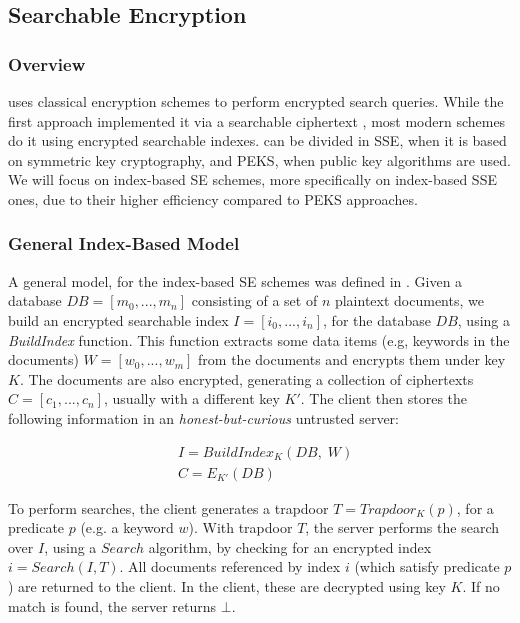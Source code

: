 \subsection{Searchable Encryption}
\label{ch2:sec:searchable-encryption}

\subsubsection{Overview}
 uses classical encryption schemes to perform encrypted search queries. While the first approach implemented it via a searchable ciphertext \autocite{Song2000-hu}, most modern schemes do it using encrypted searchable indexes.  can be divided in \gls{SSE}, when it is based on symmetric key cryptography, and \gls{PEKS}, when public key algorithms are used. We will focus on index-based \gls{SE} schemes, more specifically on index-based \gls{SSE} ones, due to their higher efficiency compared to \gls{PEKS} approaches.



\subsubsection{General Index-Based Model}

A general model, for the index-based \gls{SE} schemes was defined in \autocite{Bosch2014-eb}. Given a database $DB=[m_{0},...,m_{n}]$ consisting of a set of $n$ plaintext documents, we build an encrypted searchable index $I=[i_0,...,i_n]$, for the database $DB$, using a \emph{BuildIndex} function. This function extracts some data items (e.g, keywords in the documents) $W=[w_{0},...,w_{m}]$ from the documents and encrypts them under key $K$. The documents are also encrypted, generating a collection of ciphertexts $C=[c_1,...,c_n]$, usually with a different key $K'$. The client then stores the following information in an \emph{honest-but-curious} untrusted server:

\begin{equation}
    \begin{split}
    &I = BuildIndex_{K}(DB, \; W) \\
    &C = E_{K'}(DB) 
    \end{split}
\end{equation}

To perform searches, the client generates a trapdoor $T = Trapdoor_{K}(p)$, for a predicate $p$ (e.g. a keyword $w$). With trapdoor $T$, the server performs the search over $I$, using a $Search$ algorithm, by checking for an encrypted index $i = Search(I,T)$. All documents referenced by index $i$ (which satisfy predicate $p$) are returned to the client. In the client, these are decrypted using key $K$. If no match is found, the server returns $\bot$.

